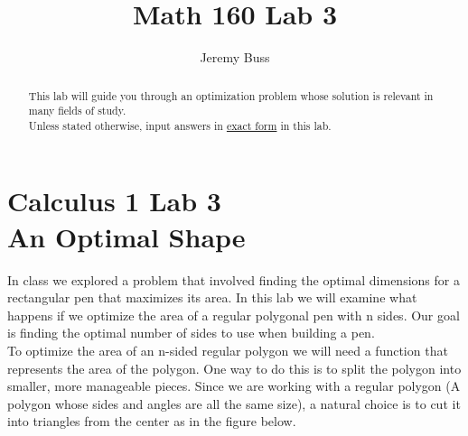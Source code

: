 \documentclass[handout,nooutcomes]{ximera}
\title{Math 160 Lab 3}
\author{Jeremy Buss} %
\begin{document}
\section{Calculus 1 Lab 3 \\ An Optimal Shape}

\begin{abstract}
This lab will guide you through an optimization problem whose solution is relevant in many fields of study.\\

Unless stated otherwise, input answers in \underline{exact form} in this lab.
\end{abstract}

\maketitle

\hspace{2cm}In class we explored a problem that involved finding the optimal dimensions for a rectangular pen that maximizes its area. In this lab we will examine what happens if we optimize the area of a regular polygonal pen with n sides. Our goal is finding the optimal number of sides to use when building a pen.\\

\medskip
\hspace{2cm}To optimize the area of an n-sided regular polygon we will need a function that represents the area of the polygon. One way to do this is to split the polygon into smaller, more manageable pieces. Since we are working with a regular polygon (A polygon whose sides and angles are all the same size), a natural choice is to cut it into triangles from the center as in the figure below.

\end{document}
